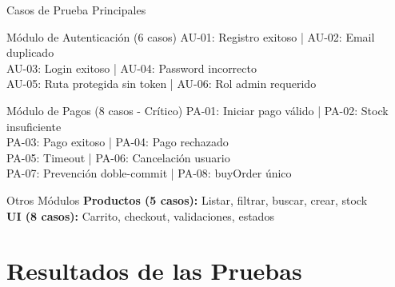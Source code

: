 \documentclass[aspectratio=169]{beamer}
\begin{document}
\begin{frame}{Casos de Prueba Principales}
\begin{block}{Módulo de Autenticación (6 casos)}
AU-01: Registro exitoso \quad | \quad AU-02: Email duplicado \\
AU-03: Login exitoso \quad | \quad AU-04: Password incorrecto \\
AU-05: Ruta protegida sin token \quad | \quad AU-06: Rol admin requerido
\end{block}

\vspace{0.3cm}

\begin{block}{Módulo de Pagos (8 casos - Crítico)}
PA-01: Iniciar pago válido \quad | \quad PA-02: Stock insuficiente \\
PA-03: Pago exitoso \quad | \quad PA-04: Pago rechazado \\
PA-05: Timeout \quad | \quad PA-06: Cancelación usuario \\
PA-07: Prevención doble-commit \quad | \quad PA-08: buyOrder único
\end{block}

\vspace{0.3cm}

\begin{block}{Otros Módulos}
\textbf{Productos (5 casos):} Listar, filtrar, buscar, crear, stock \\
\textbf{UI (8 casos):} Carrito, checkout, validaciones, estados
\end{block}
\end{frame}

\section{Resultados de las Pruebas}
\end{document}
